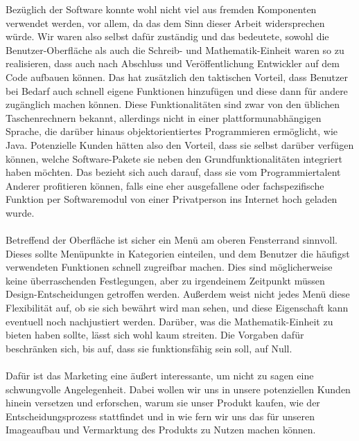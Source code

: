 Bezüglich der Software konnte wohl nicht viel aus fremden Komponenten verwendet werden, vor allem, da das dem Sinn dieser Arbeit widersprechen würde. Wir waren also selbst dafür zuständig und das bedeutete, sowohl die Benutzer-Oberfläche als auch die Schreib- und Mathematik-Einheit waren so zu realisieren, dass auch nach Abschluss und Veröffentlichung Entwickler auf dem Code aufbauen können. Das hat zusätzlich den taktischen Vorteil, dass Benutzer bei Bedarf auch schnell eigene Funktionen hinzufügen und diese dann für andere zugänglich machen können. Diese Funktionalitäten sind zwar von den üblichen Taschenrechnern bekannt, allerdings nicht in einer plattformunabhängigen Sprache, die darüber hinaus objektorientiertes Programmieren ermöglicht, wie Java.
Potenzielle Kunden hätten also den Vorteil, dass sie selbst darüber verfügen können, welche Software-Pakete sie neben den Grundfunktionalitäten integriert haben möchten. Das bezieht sich auch darauf, dass sie vom Programmiertalent Anderer profitieren können, falls eine eher ausgefallene oder fachspezifische Funktion per Softwaremodul von einer Privatperson ins Internet hoch geladen wurde.\\\\
Betreffend der Oberfläche ist sicher ein Menü am oberen Fensterrand sinnvoll. Dieses sollte Menüpunkte in Kategorien einteilen, und dem Benutzer die häufigst verwendeten Funktionen schnell zugreifbar machen. Dies sind möglicherweise keine überraschenden Festlegungen, aber zu irgendeinem Zeitpunkt müssen Design-Entscheidungen getroffen werden. Außerdem weist nicht jedes Menü diese Flexibilität auf, ob sie sich bewährt wird man sehen, und diese Eigenschaft kann eventuell noch nachjustiert werden.
Darüber, was die Mathematik-Einheit zu bieten haben sollte, lässt sich wohl kaum streiten. Die Vorgaben dafür beschränken sich, bis auf, dass sie funktionsfähig sein soll, auf Null.\\\\
Dafür ist das Marketing eine äußert interessante, um nicht zu sagen eine schwungvolle Angelegenheit. Dabei wollen wir uns in unsere potenziellen Kunden hinein versetzen und erforschen, warum sie unser Produkt kaufen, wie der Entscheidungsprozess stattfindet und in wie fern wir uns das für unseren Imageaufbau und Vermarktung des Produkts zu Nutzen machen können.
